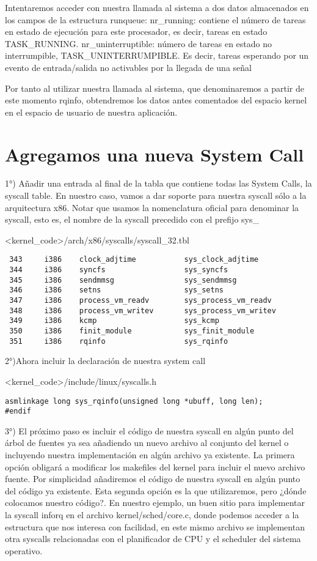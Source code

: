 Intentaremos acceder con nuestra llamada al sistema a dos datos almacenados en los campos de la estructura runqueue:
nr\_running: contiene el número de tareas en estado de ejecución para este procesador, es decir, tareas en estado TASK\_RUNNING.
nr\_uninterruptible: número de tareas en estado no interrumpible, TASK\_UNINTERRUMPIBLE. Es decir, tareas esperando por un evento de entrada/salida no activables por la llegada de una señal

Por tanto al utilizar nuestra llamada al sistema, que denominaremos a partir de este momento rqinfo, obtendremos los datos antes comentados del espacio kernel en el espacio de usuario de nuestra aplicación.

\section{Agregamos una nueva System Call}
1°) Añadir una entrada al final de la tabla que contiene todas las System Calls, la syscall table. En nuestro caso, vamos a dar soporte para nuestra syscall sólo a la arquitectura x86. Notar que usamos la nomenclatura oficial para denominar la syscall, esto es, el nombre de la syscall precedido con el prefijo sys\_

<kernel\_code>/arch/x86/syscalls/syscall\_32.tbl
\begin{verbatim}
 343     i386    clock_adjtime           sys_clock_adjtime               
 344     i386    syncfs                  sys_syncfs
 345     i386    sendmmsg                sys_sendmmsg                    
 346     i386    setns                   sys_setns
 347     i386    process_vm_readv        sys_process_vm_readv            
 348     i386    process_vm_writev       sys_process_vm_writev           
 349     i386    kcmp                    sys_kcmp
 350     i386    finit_module            sys_finit_module
 351     i386    rqinfo                  sys_rqinfo
\end{verbatim}


2°)Ahora incluir la declaración de nuestra system call


<kernel\_code>/include/linux/syscalls.h
\begin{verbatim}
asmlinkage long sys_rqinfo(unsigned long *ubuff, long len);
#endif
\end{verbatim}

3°) El próximo paso es incluir el código de nuestra syscall en algún punto del árbol de fuentes ya sea añadiendo un nuevo archivo al conjunto del kernel o incluyendo nuestra implementación en algún archivo ya existente. La primera opción obligará a modificar los makefiles del kernel para incluir el nuevo archivo fuente. Por simplicidad añadiremos el código de nuestra syscall en algún punto del código ya existente. Esta segunda opción es la que utilizaremos, pero ¿dónde colocamos nuestro código?. En nuestro ejemplo, un buen sitio para implementar la syscall inforq en el archivo kernel/sched/core.c, donde podemos acceder a la estructura que nos interesa con facilidad, en este mismo archivo se implementan otra syscalls relacionadas con el planificador de CPU y el scheduler del sistema operativo.

